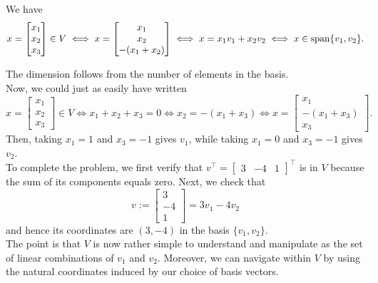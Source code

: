 We have 
$$ x=\begin{bmatrix} x_1 \\x_2 \\x_3  \end{bmatrix} \in V \iff  x= \begin{bmatrix} x_1 \\x_2 \\-(x_1 + x_2)  \end{bmatrix} \iff x = x_1 v_1 + x_2 v_2 \iff x \in \mathrm{span} \{ v_1, v_2 \}.$$

The dimension follows from the number of elements in the basis. \\

Now, we could just as easily have written
$$ x=\begin{bmatrix} x_1 \\x_2 \\x_3  \end{bmatrix} \in V \iff x_1+x_2+x_3=0 \iff x_2 = -(x_1 + x_3) \iff x= \begin{bmatrix} x_1 \\-(x_1 + x_3) \\x_3  \end{bmatrix}.$$
Then, taking $x_1=1$ and $x_3 = -1$ gives $v_1$, while taking $x_1=0$ and $x_3 = -1$ gives $v_2.$ \\

To complete the problem, we first verify that $v^\top = \left[\begin{array}{rrr}  3 & -4 & 1\end{array}\right]^\top $ is in $V$ because the sum of its components equals zero. Next, we check that
$$ v:= \left[\begin{array}{r}
    3 \\ -4 \\ 1
\end{array}\right] = 3 v_1 - 4 v_2$$
and hence its coordinates are $(3, -4)$ in the basis $\{v_1, v_2\}$.
\Qed\\

The point is that $V$ is now rather simple to understand and manipulate as the set of linear combinations of $v_1$ and $v_2$. Moreover, we can navigate within $V$ by using the natural coordinates induced by our choice of basis vectors. \\

